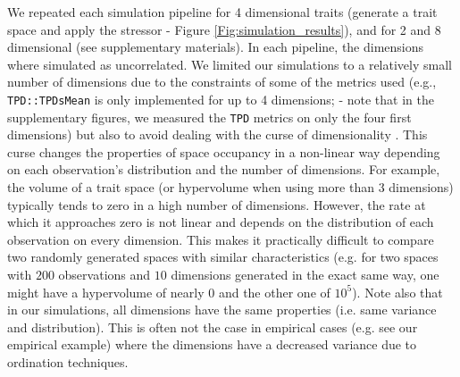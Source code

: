 \documentclass[12pt,letterpaper]{article}
\begin{document}
We repeated each simulation pipeline for 4 dimensional traits (generate a trait space and apply the stressor - Figure \ref{Fig:simulation_results}), and for 2 and 8 dimensional (see supplementary materials).
In each pipeline, the dimensions where simulated as uncorrelated.
We limited our simulations to a relatively small number of dimensions due to the constraints of some of the metrics used (e.g., \texttt{TPD::TPDsMean} is only implemented for up to 4 dimensions; \citealt{carmona2019trait} - note that in the supplementary figures, we measured the \texttt{TPD} metrics on only the four first dimensions) but also to avoid dealing with the curse of dimensionality \citep{bellman1957dynamic}.
This curse changes the properties of space occupancy in a non-linear way depending on each observation's distribution and the number of dimensions.
For example, the volume of a trait space (or hypervolume when using more than 3 dimensions) typically tends to zero in a high number of dimensions.
However, the rate at which it approaches zero is not linear and depends on the distribution of each observation on every dimension.
This makes it practically difficult to compare two randomly generated spaces with similar characteristics (e.g. for two spaces with $200$ observations and $10$ dimensions generated in the exact same way, one might have a hypervolume of nearly $0$ and the other one of $10^5$).
Note also that in our simulations, all dimensions have the same properties (i.e. same variance and distribution).
This is often not the case in empirical cases (e.g. see our empirical example) where the dimensions have a decreased variance due to ordination techniques.
 
\end{document}
